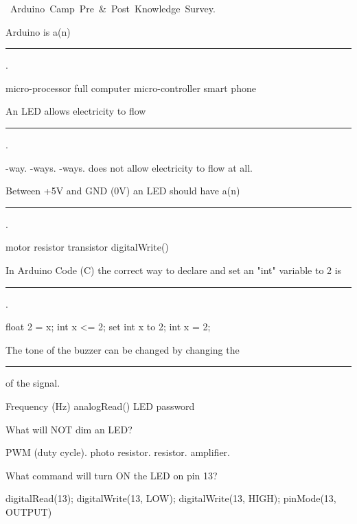 \documentclass{exam}
\begin{document}
\hfill{}
\begin{center}
  \mbox{\mbox{\centering
    {\Large Arduino Camp Pre \& Post Knowledge Survey}.}}
\end{center}
\vspace{.2in}

\begin{questions}
 
  \question Arduino is a(n) \rule{1in}{1pt}.
    \begin{choices}
      \choice micro-processor
      \choice full computer
      \choice micro-controller
      \choice smart phone
    \end{choices}
  
  \question An LED allows electricity to flow \rule{1in}{1pt}.
    \begin{choices}
      -way.
      -ways.
      -ways.
      \choice does not allow electricity to flow at all. 
    \end{choices}
  
  \question Between +5V and GND (0V) an LED should have a(n) \rule{1in}{1pt}.
    \begin{choices}
      \choice motor
      \choice resistor
      \choice transistor
      \choice digitalWrite()
    \end{choices}
  
  \question In Arduino Code (C) the correct way to declare and set an "int" variable to 2 is \rule{1in}{1pt}.
    \begin{choices}
      \choice float 2 = x;
      \choice int x \textless= 2; 
      \choice set int x to 2;
      \choice int x = 2;
    \end{choices}
  
  \question The tone of the buzzer can be changed by changing the \rule{1in}{1pt} of the signal. 
    \begin{choices}
      \choice Frequency (Hz)
      \choice analogRead()
      \choice LED
      \choice password
    \end{choices}
  
  \question What will NOT dim an LED? 
    \begin{choices}
      \choice PWM (duty cycle).
      \choice photo resistor.
      \choice resistor.
      \choice amplifier. 
    \end{choices}
  
  \newpage
  \question What command will turn ON the LED on pin 13? 
    \begin{choices}
      \choice digitalRead(13); 
      \choice digitalWrite(13, LOW);
      \choice digitalWrite(13, HIGH);
      \choice pinMode(13, OUTPUT)
    \end{choices}
  

\end{questions}
\end{document}
